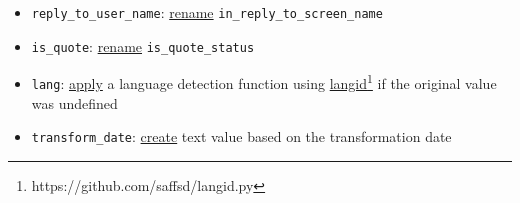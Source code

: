 \begin{itemize}
    \item \texttt{reply\_to\_user\_name}: \underline{rename} \texttt{in\_reply\_to\_screen\_name}
    \item \texttt{is\_quote}: \underline{rename} \texttt{is\_quote\_status}
    \item \texttt{lang}: \underline{apply} a language detection function using \href{https://github.com/saffsd/langid.py}{langid}\footnote{https://github.com/saffsd/langid.py} if the original value was undefined
    \item \texttt{transform\_date}: \underline{create} text value based on the transformation date
\end{itemize}